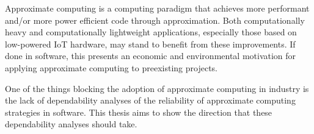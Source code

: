 
Approximate computing is a computing paradigm that achieves more performant and/or more power efficient code through approximation. Both computationally heavy and computationally lightweight applications, especially those based on low-powered IoT hardware, may stand to benefit from these improvements. If done in software, this presents an economic and environmental motivation for applying approximate computing to preexisting projects. 

One of the things blocking the adoption of approximate computing in industry is the lack of dependability analyses of the reliability of approximate computing strategies in software. This thesis aims to show the direction that these dependability analyses should take.